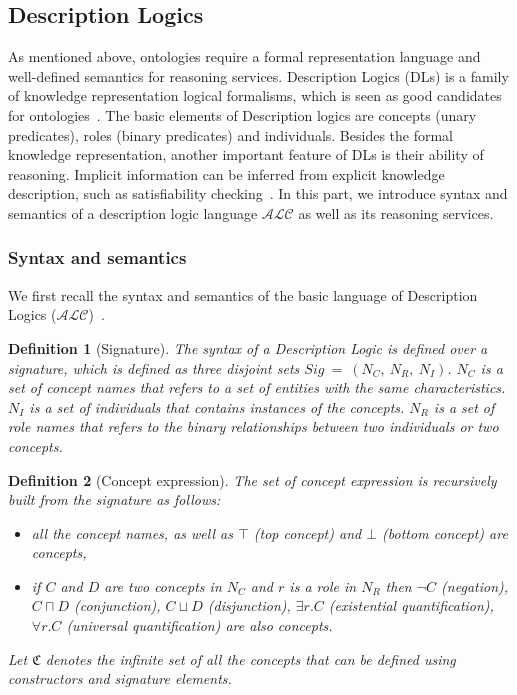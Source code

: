 \documentclass{article}
\newtheorem{mydef}{Definition}
\begin{document}
\subsection{Description Logics}
As mentioned above, ontologies require a formal representation language and well-defined semantics for reasoning services. 
Description Logics (DLs) is a family of knowledge representation logical formalisms, which is seen as good candidates for ontologies~\cite{horrocks1999description}.
The basic elements of Description logics are concepts (unary predicates), roles (binary predicates) and individuals.
Besides the formal knowledge representation, another important feature of DLs is their ability of reasoning.
Implicit information can be inferred from explicit knowledge description, such as satisfiability checking~\cite{baader2003description}. 
In this part, we introduce syntax and semantics of a description logic language $\mathcal{ALC}$ as well as its reasoning services.
\subsubsection{Syntax and semantics}
\label{subsec:synt}
We first recall the syntax and semantics of the basic language of Description Logics ($\mathcal{ALC}$)~\cite{baader2003description}.
\begin{mydef}[Signature]
 The syntax of a Description Logic is defined over a signature, which is defined as three disjoint sets $Sig~=~(N_C,~N_R,~N_I)$. $N_C$ is a set of concept names that refers to a set of entities
 with the same characteristics. $N_I$ is a set of individuals that contains instances of the concepts.  $N_R$ is a set of role names that refers to the binary relationships between 
 two individuals or two concepts.
\end{mydef}


\begin{mydef}[Concept expression]
 The set of concept expression is recursively built from the signature as follows:
 \begin{itemize}
  \item all the concept names, as well as $\top$ (top concept) and $\bot$ (bottom concept) are concepts,
  \item if $C$ and $D$ are two concepts in $N_C$ and $r$ is a role in $N_R$
  then $\neg C$ (negation), $ C\sqcap D$ (conjunction), $ C\sqcup D$ (disjunction), $ \exists r.C$ (existential quantification), $\forall r.C$ (universal quantification) are also concepts.
 \end{itemize}
 Let $\mathfrak{C}$ denotes the infinite set of all the concepts that can be defined using constructors and signature elements.
\end{mydef}
\end{document}
